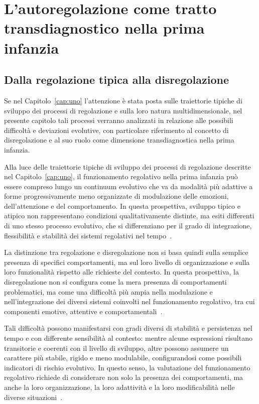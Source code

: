 \chapter{L'autoregolazione come tratto transdiagnostico nella prima infanzia}
\label{cap:due}
    \section{Dalla regolazione tipica alla disregolazione}
    \label{sec:2_1}

        Se nel Capitolo~\ref{cap:uno} l'attenzione è stata posta sulle traiettorie tipiche di sviluppo dei processi di regolazione e sulla loro natura multidimensionale, nel presente capitolo tali processi verranno analizzati in relazione alle possibili difficoltà e deviazioni evolutive, con particolare riferimento al concetto di disregolazione e al suo ruolo come dimensione transdiagnostica nella prima infanzia.

        Alla luce delle traiettorie tipiche di sviluppo dei processi di regolazione descritte nel Capitolo~\ref{cap:uno}, il funzionamento regolativo nella prima infanzia può essere compreso lungo un continuum evolutivo che va da modalità più adattive a forme progressivamente meno organizzate di modulazione delle emozioni, dell'attenzione e del comportamento. In questa prospettiva, sviluppo tipico e atipico non rappresentano condizioni qualitativamente distinte, ma esiti differenti di uno stesso processo evolutivo, che si differenziano per il grado di integrazione, flessibilità e stabilità dei sistemi regolativi nel tempo~\cite{calkins2007,cicchetti2009}.

        La distinzione tra regolazione e disregolazione non si basa quindi sulla semplice presenza di specifici comportamenti, ma sul loro livello di organizzazione e sulla loro funzionalità rispetto alle richieste del contesto. In questa prospettiva, la disregolazione non si configura come la mera presenza di comportamenti problematici, ma come una difficoltà più ampia nella modulazione e nell'integrazione dei diversi sistemi coinvolti nel funzionamento regolativo, tra cui componenti emotive, attentive e comportamentali~\cite{eisenberg2010}.

        Tali difficoltà possono manifestarsi con gradi diversi di stabilità e persistenza nel tempo e con differente sensibilità al contesto: mentre alcune espressioni risultano transitorie e coerenti con il livello di sviluppo, altre possono assumere un carattere più stabile, rigido e meno modulabile, configurandosi come possibili indicatori di rischio evolutivo. In questo senso, la valutazione del funzionamento regolativo richiede di considerare non solo la presenza dei comportamenti, ma anche la loro organizzazione, la loro adattività e la loro modificabilità nelle diverse situazioni~\cite{tronick2007}.

